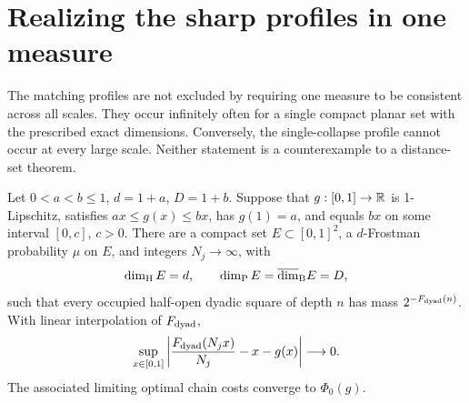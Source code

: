 \section{Realizing the sharp profiles in one measure}
\label{realization:section}

The matching profiles are not excluded by requiring one measure to be
consistent across all scales. They occur infinitely often for a single
compact planar set with the prescribed exact dimensions. Conversely, the
single-collapse profile cannot occur at every large scale. Neither statement
is a counterexample to a distance-set theorem.

\begin{theorem}\label{realization:theorem}
Let \(0<a<b\le1\), \(d=1+a\), \(D=1+b\). Suppose that
\(g:[0,1]\to\mathbb R\) is 1-Lipschitz, satisfies
\(ax\le g(x)\le bx\), has \(g(1)=a\), and equals \(bx\) on
some interval \([0,c]\), \(c>0\). There are a compact set
\(E\subset[0,1]^2\), a \(d\)-Frostman probability \(\mu\) on \(E\),
and integers \(N_j\to\infty\), with
\[
 \dim_{\mathrm H} E=d,\qquad \dim_{\mathrm P} E=\overline{\dim}_{\rm B}E=D,
\]
such that every occupied half-open dyadic square of depth \(n\) has mass
\(2^{-F_{\rm dyad}(n)}\). With linear interpolation of \(F_{\rm dyad}\),
\begin{equation}\label{realization:convergence}
 \sup_{x\in[0,1]}
 \left|\frac{F_{\rm dyad}(N_jx)}{N_j}-x-g(x)\right|\longrightarrow0.
\end{equation}
The associated limiting optimal chain costs converge to \(\Phi_0(g)\).
\end{theorem}

